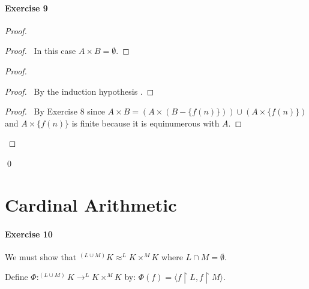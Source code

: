 \documentclass{report}
\begin{document}
    \paragraph{Exercise 9}
    \begin{proof}
        \pf
        \begin{proof}
            \pf\ In this case $A \times B = \emptyset$.
        \end{proof}
        \begin{proof}
            \begin{proof}
                \pf\ By the induction hypothesis .
            \end{proof}
            \begin{proof}
                \pf\ By Exercise 8 since $A \times B = (A \times (B - \{ f(n) \})) \cup (A \times \{ f(n) \})$
                and $A \times \{ f(n) \}$ is finite because it is equinumerous with $A$.
            \end{proof}
        \end{proof}
        \qed
    \end{proof}
    
    \section{Cardinal Arithmetic}

    \paragraph{Exercise 10}
    We must show that $^{(L \cup M)}K \approx ^L K \times ^M K$ where $L \cap M = \emptyset$.

    Define $\Phi : ^{(L \cup M)}K \rightarrow ^L K \times ^M K$ by: $\Phi(f) = \langle f \restriction L,
    f \restriction M \rangle$.
\end{document}
